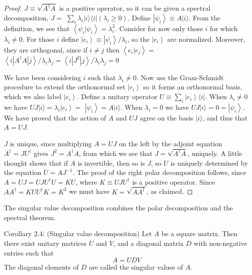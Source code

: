 \begin{proof}
    $J \equiv \sqrt{A^{\dagger} A}$ is a positive operator, so it can be given a spectral decomposition, $J=$ $\sum_{i} \lambda_{i}|i\rangle\langle i|\left(\lambda_{i} \geq 0\right)$. Define $\left|\psi_{i}\right\rangle \equiv A|i\rangle$. From the definition, we see that $\left\langle\psi_{i} | \psi_{i}\right\rangle=\lambda_{i}^{2}$. Consider for now only those $i$ for which $\lambda_{i} \neq 0$. For those $i$ define $\left|e_{i}\right\rangle \equiv\left|\psi_{i}\right\rangle / \lambda_{i}$, so the $\left|e_{i}\right\rangle$ are normalized. Moreover, they are orthogonal, since if $i \neq j$ then $\left\langle e_{i} | e_{j}\right\rangle=$ $\left\langle i\left|A^{\dagger} A\right| j\right\rangle / \lambda_{i} \lambda_{j}=\left\langle i\left|J^{2}\right| j\right\rangle / \lambda_{i} \lambda_{j}=0$

We have been considering $i$ such that $\lambda_{i} \neq 0$. Now use the Gram-Schmidt procedure to extend the orthonormal set $\left|e_{i}\right\rangle$ so it forms an orthonormal basis, which we also label $\left|e_{i}\right\rangle$. Define a unitary operator $U \equiv \sum_{i}\left|e_{i}\right\rangle\langle i|$. When $\lambda_{i} \neq 0$ we have $U J|i\rangle=\lambda_{i}\left|e_{i}\right\rangle=$ $\left|\psi_{i}\right\rangle=A|i\rangle$. When $\lambda_{i}=0$ we have $U J|i\rangle=0=\left|\psi_{i}\right\rangle$. We have proved that the action of $A$ and $U J$ agree on the basis $|i\rangle$, and thus that $A=U J$.

$J$ is unique, since multiplying $A=U J$ on the left by the adjoint equation $A^{\dagger}=J U^{\dagger}$ gives $J^{2}=A^{\dagger} A$, from which we see that $J=\sqrt{A^{\dagger} A}$, uniquely. A little thought shows that if $A$ is invertible, then so is $J$, so $U$ is uniquely determined by the equation $U=A J^{-1}$. The proof of the right polar decomposition follows, since $A=U J=U J U^{\dagger} U=K U$, where $K \equiv U J U^{\dagger}$ is a positive operator. Since $A A^{\dagger}=K U U^{\dagger} K=K^{2}$ we must have $K=\sqrt{A A^{\dagger}}$, as claimed.
\end{proof}

The singular value decomposition combines the polar decomposition and the spectral theorem.

\begin{corollary}
Corollary 2.4: (Singular value decomposition) Let $A$ be a square matrix. Then there exist unitary matrices $U$ and $V$, and a diagonal matrix $D$ with non-negative entries such that
$$
A=U D V
$$
The diagonal elements of $D$ are called the singular values of $A$.
\end{corollary}

